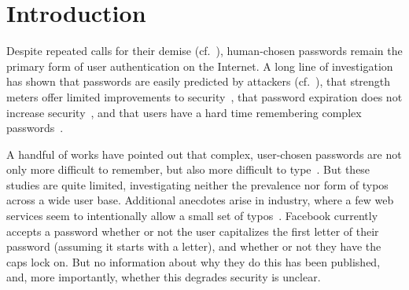 \section{Introduction}
\label{sec:intro}

Despite repeated calls for their demise (cf.~\cite{bhos12}),
human-chosen passwords remain the primary form of user authentication
on the Internet.  A long line of investigation has shown that
passwords are easily predicted by attackers
(cf.~\cite{florencio2007lsw,bonneau12b,ur2015added}), that strength meters
offer limited improvements to security~\cite{ur2012does},
that password expiration does not increase
security~\cite{zhang:2010:security}, and that 
users have a hard time remembering complex
passwords~\cite{shay2012correct,shay2014can,bonneau2014towards,ur2012does}.

A handful of works have pointed out that complex, user-chosen
passwords are not only more difficult to remember, but also more
difficult to
type~\cite{keith2007usability,keith2009behavioral,shay2014can}.  But
these studies are quite limited, investigating neither the prevalence
nor form of typos across a wide user base.  Additional anecdotes arise
in industry, where a few web services seem to intentionally allow a
small set of
typos~\cite{muffett15,zdnet2011Facebook,vanguard15v,vanguard15i}.
Facebook currently accepts a password whether or not the user
capitalizes the first letter of their password (assuming it starts
with a letter), and whether or not they have the caps lock on. But no
information about why they do this has been published, and, more
importantly, whether this degrades security is unclear.



